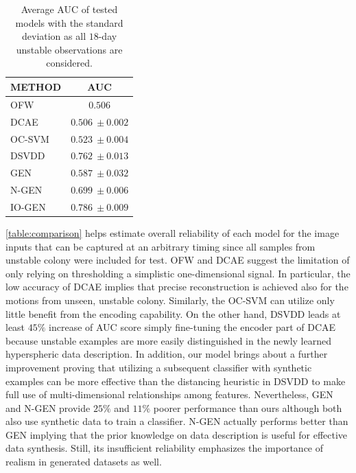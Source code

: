 \documentclass[letterpaper]{article} %
\let\orgautoref\autoref
\providecommand{\Autoref}
{\def\equationautorefname{Equation}%
	\def\figureautorefname{Figure}%
	\def\subfigureautorefname{Figure}%
	\def\Itemautorefname{Item}%
	\def\tableautorefname{Table}%
	\def\exerciseautorefname{Exercise}%
	\def\starexerciseautorefname{Exercise}%
	\def\sectionautorefname{Section}%
	\def\subsectionautorefname{Section}%
	\def\subsubsectionautorefname{Section}%
	\def\chapterautorefname{Section}%
	\def\partautorefname{Part}%
	\orgautoref}
\renewcommand{\autoref}
{\def\equationautorefname{Equation}%
	\def\figureautorefname{Fig.}%
	\def\subfigureautorefname{Fig.}%
	\def\Itemautorefname{item}%
	\def\tableautorefname{Table}%
	\def\exerciseautorefname{Exercise}%
	\def\starexerciseautorefname{Exercise}%
	\def\sectionautorefname{Section}%
	\def\subsectionautorefname{Section}%
	\def\subsubsectionautorefname{Section}%
	\def\chapterautorefname{Section}%
	\def\partautorefname{Part}%
	\orgautoref}
\begin{document}
\setlength{\tabcolsep}{0.5em} %
{\renewcommand{\arraystretch}{1.2}%
	\begin{table}[t]
		\centering
		\begin{tabular}{|p{40mm}c|} %
			\hline
			METHOD & AUC \\ \hline\hline
			OFW & $0.506$ \\ %
			DCAE & $0.506~\pm 0.002$ \\ %
			OC-SVM & $0.523~\pm 0.004$ \\ %
			DSVDD & $0.762~\pm 0.013$ \\ %
			GEN & $0.587~\pm 0.032$ \\ %
			N-GEN & $0.699~\pm 0.006$ \\ \hline\hline
			IO-GEN & $\mathbf{0.786~\pm 0.009}$ \\ \hline
		\end{tabular}
		\caption{Average AUC of tested models with the standard deviation
		as all $18$-day unstable observations are considered.}
		\label{table:comparison}
	\end{table}
}
\Autoref{table:comparison} helps estimate overall reliability of each
model for the image inputs that can be captured at an arbitrary timing
since all samples from unstable colony were included for test. OFW and
DCAE suggest the limitation of only relying on thresholding a simplistic
one-dimensional signal. In particular, the low accuracy of DCAE implies
that precise reconstruction is achieved also for the motions from
unseen, unstable colony.
Similarly, the OC-SVM can utilize only little benefit from the
encoding capability. On the other hand, DSVDD leads at least $45\%$
increase of AUC score simply fine-tuning the encoder part of DCAE
because unstable examples are more easily distinguished in the newly
learned hyperspheric data description. In addition, our model brings
about a further improvement proving that utilizing a subsequent
classifier with synthetic examples can be more effective than the
distancing heuristic in DSVDD to make full use of multi-dimensional
relationships among features. Nevertheless, GEN and \mbox{N-GEN} provide $25\%$
and $11\%$ poorer performance than ours although both also use synthetic
data to train a classifier. \mbox{N-GEN} actually performs better than GEN
implying that the prior knowledge on data description is useful for
effective data synthesis. Still, its insufficient reliability emphasizes
the importance of realism in generated datasets as well.
\end{document}
